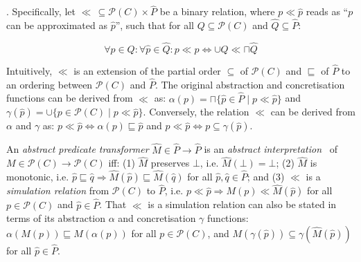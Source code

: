 

\footnotemark. Specifically, let $\ll \, \subseteq \mathcal{P}(C) \times \hat P$ be a binary relation, where $p \ll \hat p$ reads as ``$p$ can be approximated as $\hat p$'', such that for all $Q \subseteq \mathcal{P}(C)$ and $\hat Q \subseteq \hat P$:


\begin{equation*}
\forall p \in Q : \forall \hat p \in \hat Q : p \ll \hat p \iff \cup Q \ll \sqcap \hat Q
\end{equation*}

\noindent Intuitively, $\ll$ is an extension of the partial order $\subseteq$ of $\mathcal{P}(C)$ and $\sqsubseteq$ of $\hat P$ to an ordering between $\mathcal{P}(C)$ and $\hat P$. The original abstraction and concretisation functions can be derived from $\ll$ as: $\alpha(p) = \sqcap \{ \hat p \in \hat P \mid p \ll \hat p \}$ and $\gamma(\hat p) = \cup \{ p \in \mathcal{P}(C) \mid p \ll \hat p \}$. Conversely, the relation $\ll$ can be derived from $\alpha$ and $\gamma$ as: $p \ll \hat p \iff \alpha(p) \sqsubseteq \hat p$ and $p \ll \hat p \iff p \subseteq \gamma(\hat p)$.

An \textit{abstract predicate transformer} $\hat M \in \hat P \rightarrow \hat P$ is an \textit{abstract interpretation}~\cite{cousot1996} of $M \in \mathcal{P}(C) \rightarrow \mathcal{P}(C)$ iff: (1) $\hat M$ preserves $\bot$, i.e. $\hat M(\bot) = \bot$; (2) $\hat M$ is monotonic, i.e. $\hat p \sqsubseteq \hat q \Rightarrow \hat M (\hat p) \sqsubseteq \hat M (\hat q)$ for all $\hat p, \hat q \in \hat P$; and (3) $\ll$ is a \textit{simulation relation} from $\mathcal{P}(C)$ to $\hat P$, i.e. $p \ll \hat p \Rightarrow M (p) \ll \hat M (\hat p)$ for all $p \in \mathcal{P}(C)$ and $\hat p \in \hat P$. That $\ll$ is a simulation relation can also be stated in terms of its abstraction $\alpha$ and concretisation $\gamma$ functions: $\alpha(M(p)) \sqsubseteq \hat M(\alpha(p))$ for all $p \in \mathcal{P}(C)$, and $M(\gamma(\hat p)) \subseteq \gamma(\hat M(\hat p))$ for all $\hat p \in \hat P$.

